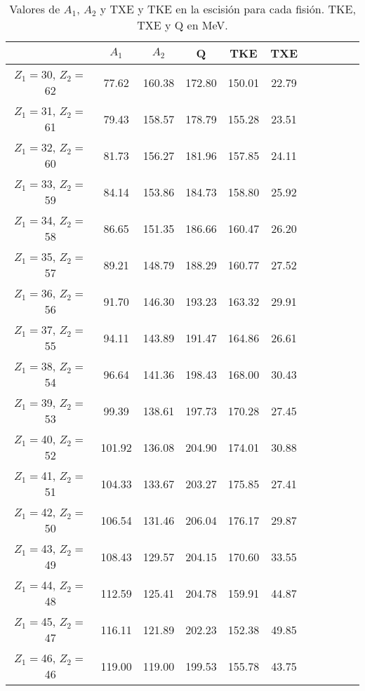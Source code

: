 \begin{table}[h!]
\caption{Valores de $A_1$, $A_2$ y TXE y TKE en la escisión para cada fisión. TKE, TXE y Q en MeV.}
\label{tab:tabla_A}
\begin{tabular}{ccccccccccc}
\toprule
 & $A_1$ & $A_2$ & Q  & TKE & TXE \\
\midrule
$Z_1=$30, $Z_2=$62 & 77.62 & 160.38 & 172.80 & 150.01 & 22.79 \\
$Z_1=$31, $Z_2=$61 & 79.43 & 158.57 & 178.79 & 155.28 & 23.51 \\
$Z_1=$32, $Z_2=$60 & 81.73 & 156.27 & 181.96 & 157.85 & 24.11 \\
$Z_1=$33, $Z_2=$59 & 84.14 & 153.86 & 184.73 & 158.80 & 25.92 \\
$Z_1=$34, $Z_2=$58 & 86.65 & 151.35 & 186.66 & 160.47 & 26.20 \\
$Z_1=$35, $Z_2=$57 & 89.21 & 148.79 & 188.29 & 160.77 & 27.52 \\
$Z_1=$36, $Z_2=$56 & 91.70 & 146.30 & 193.23 & 163.32 & 29.91 \\
$Z_1=$37, $Z_2=$55 & 94.11 & 143.89 & 191.47 & 164.86 & 26.61 \\
$Z_1=$38, $Z_2=$54 & 96.64 & 141.36 & 198.43 & 168.00 & 30.43 \\
$Z_1=$39, $Z_2=$53 & 99.39 & 138.61 & 197.73 & 170.28 & 27.45 \\
$Z_1=$40, $Z_2=$52 & 101.92 & 136.08 & 204.90 & 174.01 & 30.88 \\
$Z_1=$41, $Z_2=$51 & 104.33 & 133.67 & 203.27 & 175.85 & 27.41 \\
$Z_1=$42, $Z_2=$50 & 106.54 & 131.46 & 206.04 & 176.17 & 29.87 \\
$Z_1=$43, $Z_2=$49 & 108.43 & 129.57 & 204.15 & 170.60 & 33.55 \\
$Z_1=$44, $Z_2=$48 & 112.59 & 125.41 & 204.78 & 159.91 & 44.87 \\
$Z_1=$45, $Z_2=$47 & 116.11 & 121.89 & 202.23 & 152.38 & 49.85 \\
$Z_1=$46, $Z_2=$46 & 119.00 & 119.00 & 199.53 & 155.78 & 43.75 \\
\bottomrule
\end{tabular}
\end{table}
